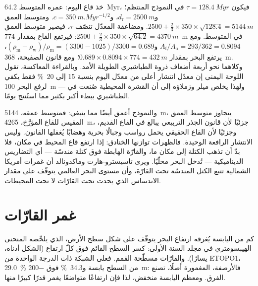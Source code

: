 \begin{example}\label{ex:b2:phanerozoic-earth:doubling}
خذ قاع اليوم: عمره المتوسط \qty{64.2}{Myr}، فيكون $\tau = \qty{128.4}{Myr}$ في النموذج المنتظم؛
و$d_{\text{r}} = \qty{2500}{m}$، و$c = \qty{350}{m.Myr^{-1/2}}$. ومتوسط العمق $2500 + \tfrac23
\times 350 \times \sqrt{128.4} = \qty{5144}{m}$. ومضاعفة المعدّل تنصّف $\tau$، فيصير متوسط
العمق $2500 + \tfrac23 \times 350 \times \sqrt{64.2} = \qty{4370}{m}$: فيرتفع القاع بمقدار
\qty{774}{m} في المتوسط. ومع $A_{\text{f}}/A_{\text{o}} = 293/362 = 0.8094$
و$(\rho_{\text{m}} - \rho_{\text{w}})/\rho_{\text{m}} = (3300 - 1025)/3300 = 0.689$، يرتفع البحر
بمقدار $0.689 \times 0.8094 \times 774 = \qty{432}{m}$؛ ومع قانون الصفيحة، \qty{368}{m}. وكلاهما
نحو أربعة أضعاف ذروة الطباشيري الطويلة الأمد. وبالقراءة المعاكسة، تقول اللوحة اليمنى إن
معدّل انتشار أعلى من معدّل اليوم بنسبة 15 إلى \qty{20}{\percent} فقط يكفي لرفع البحر \qty{100}{m} --- ولهذا
يخلص ميلر وزملاؤه إلى أن القشرة المحيطية صُنعت في الطباشيري ببطء أكبر بكثير
مما استُنتج يومًا.
\end{example}

والنموذج أعمق أيضًا مما ينبغي: فمتوسط عمقه، \qty{5144}{m}، يتجاوز متوسط العمق المقيس
للقاع المؤرَّخ، \qty{4265}{m}، جزئيًا لأن قانون الجذر التربيعي يبالغ في القاع القديم،
وجزئيًا لأن القاع الحقيقي يحمل رواسب وجبالًا بحرية وهضابًا يُغفلها القانون. وليس الانتشار
الرافعة الوحيدة. فالظهرات توازنها الخنادق: إذا ارتفع قاع المحيط في مكان، فلا بدّ أن تذهب الكتلة
إلى مكان ما، والقارّة الهابطة فوق كتلة مندسّة --- أي التضاريس الديناميكية --- تُدخل البحر
محلّيًا. ويرى تاسيسترو-هارت وماكدونالد أن غمرات أمريكا الشمالية تتبع الكتل المندسّة
تحت القارّة، وأن مستوى البحر العالمي يتوقّف على مقدار الاندساس الذي يحدث تحت
القارّات لا تحت المحيطات.

\section{غمر القارّات}\label{sec:b2:phanerozoic-earth:flooding}

كم من اليابسة يُغرقه ارتفاع البحر يتوقّف على شكل سطح الأرض، الذي يلخّصه
المنحنى الهيبسومتري في مجلد السنة الأولى: كسر السطح القائم فوق
كلّ ارتفاع (الشكل أدناه، يسارًا). والقارّات مسطّحة القمم. فعلى الشبكة ذات الدرجة الواحدة من
ETOPO1، \qty{29.0}{\percent} من السطح يابسة و\qty{34.3}{\percent} فوق
\qty{-200}{m}: فالأرصفة، المغمورة أصلًا، تصنع الفرق. ومعظم اليابسة منخفض، لذا فإن
ارتفاعًا متواضعًا يغمر قدرًا كبيرًا منها.

